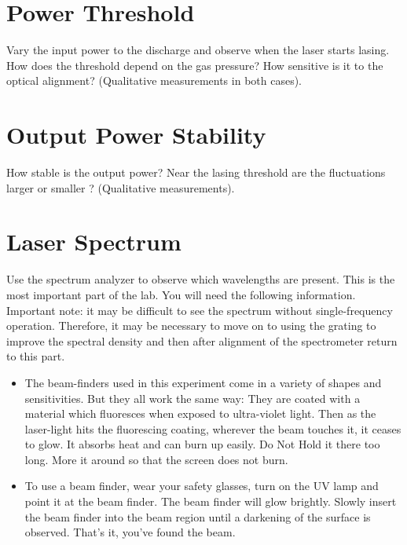 \documentclass{../lab}
\begin{document}
\section{Power Threshold}

Vary the input power to the discharge and observe when the laser starts lasing. How does the threshold depend on the gas pressure? How sensitive is it to the optical alignment? (Qualitative measurements in both cases).

\section{Output Power Stability}

How stable is the output power? Near the lasing threshold are the fluctuations larger or smaller ? (Qualitative measurements).

\section{Laser Spectrum}

Use the spectrum analyzer to observe which wavelengths are present. This is the most important part of the lab. You will need the following information. Important note: it may be difficult to see the spectrum without single-frequency operation. Therefore, it may be necessary to move on to using the grating to improve the spectral density and then after alignment of the spectrometer return to this part.

\begin{itemize}
    \item The beam-finders used in this experiment come in a variety of shapes and sensitivities. But they all work the same way: They are coated with a material which fluoresces when exposed to ultra-violet light. Then as the laser-light hits the fluorescing coating, wherever the beam touches it, it ceases to glow. It absorbs heat and can burn up easily. Do Not Hold it there too long. More it around so that the screen does not burn.
\end{itemize}

\begin{itemize}
    \item To use a beam finder, wear your safety glasses, turn on the UV lamp and point it at the beam finder. The beam finder will glow brightly. Slowly insert the beam finder into the beam region until a darkening of the surface is observed. That's it, you've found the beam.
\end{itemize}
\end{document}
